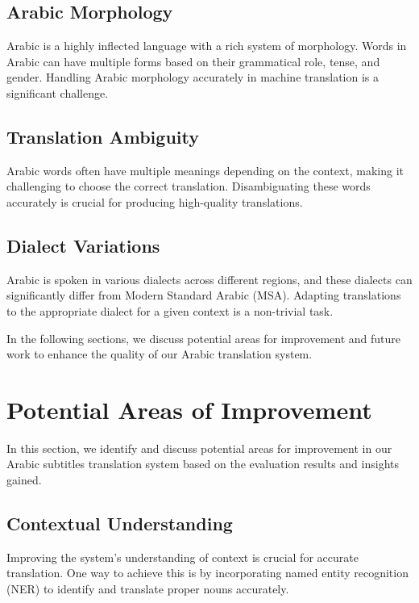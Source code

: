 \documentclass[12pt]{article}
\begin{document}
\subsection{Arabic Morphology}

Arabic is a highly inflected language with a rich system of morphology. Words in Arabic can have multiple forms based on their grammatical role, tense, and gender. Handling Arabic morphology accurately in machine translation is a significant challenge.

\subsection{Translation Ambiguity}

Arabic words often have multiple meanings depending on the context, making it challenging to choose the correct translation. Disambiguating these words accurately is crucial for producing high-quality translations.

\subsection{Dialect Variations}

Arabic is spoken in various dialects across different regions, and these dialects can significantly differ from Modern Standard Arabic (MSA). Adapting translations to the appropriate dialect for a given context is a non-trivial task.


In the following sections, we discuss potential areas for improvement and future work to enhance the quality of our Arabic translation system.

\section{Potential Areas of Improvement}
In this section, we identify and discuss potential areas for improvement in our Arabic subtitles translation system based on the evaluation results and insights gained.


\subsection{Contextual Understanding}

Improving the system's understanding of context is crucial for accurate translation. One way to achieve this is by incorporating named entity recognition (NER) to identify and translate proper nouns accurately.
\end{document}
